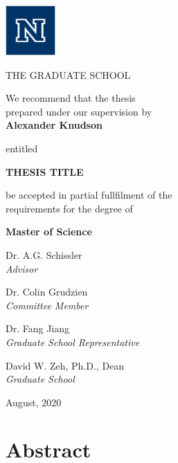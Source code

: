 \documentclass[11pt, oneside]{book}
\begin{document}
\newpage
\thispagestyle{empty}
\begin{center}

\includegraphics[width=0.75in, height=0.75in]{./figures/unr_logos/University Logo RGB_block_n_blue}

THE GRADUATE SCHOOL

\vspace{1em}
We recommend that the thesis \\
prepared under our supervision by\\

\vspace{1em}
\textbf{Alexander Knudson}

\vspace{1em}
entitled

\textbf{THESIS TITLE}

\vspace{2em}
be accepted in partial fullfilment of the \\
requirements for the degree of

\vspace{1em}
\textbf{Master of Science}

\vspace{1em}
Dr. A.G. Schissler \\
\textit{Advisor}

\vspace{1em}
Dr. Colin Grudzien\\
\textit{Committee Member}

\vspace{1em}
Dr. Fang Jiang \\
\textit{Graduate School Representative}

\vspace{1em}
David W. Zeh, Ph.D., Dean \\
\textit{Graduate School}

\vspace{1em}
August, 2020
\end{center}


\newpage
\setcounter{page}{1} %
\section*{Abstract}
\lipsum[1]
\end{document}
